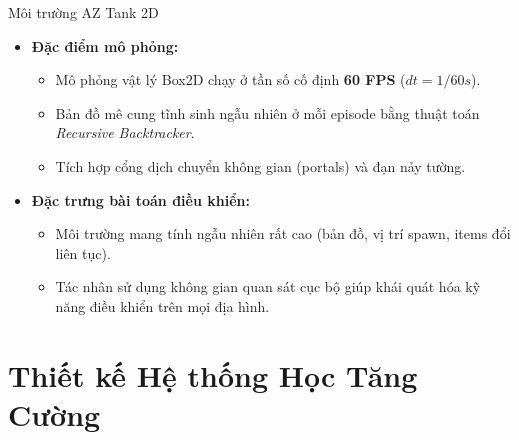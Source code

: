\documentclass[aspectratio=169]{beamer}
\begin{document}
\begin{frame}{Môi trường AZ Tank 2D}
  \begin{itemize}
    \item \textbf{\color{hustred}Đặc điểm mô phỏng:}
      \begin{itemize}
        \item Mô phỏng vật lý Box2D chạy ở tần số cố định \textbf{60 FPS} ($dt = 1/60s$).
        \item Bản đồ mê cung tĩnh sinh ngẫu nhiên ở mỗi episode bằng thuật toán \textit{Recursive Backtracker}.
        \item Tích hợp cổng dịch chuyển không gian (portals) và đạn nảy tường.
      \end{itemize}
    \vspace{0.8em}
    \item \textbf{\color{hustred}Đặc trưng bài toán điều khiển:}
      \begin{itemize}
        \item Môi trường mang tính ngẫu nhiên rất cao (bản đồ, vị trí spawn, items đổi liên tục).
        \item Tác nhân sử dụng không gian quan sát cục bộ giúp khái quát hóa kỹ năng điều khiển trên mọi địa hình.
      \end{itemize}
  \end{itemize}
\end{frame}

\section{Thiết kế Hệ thống Học Tăng Cường}
\end{document}
